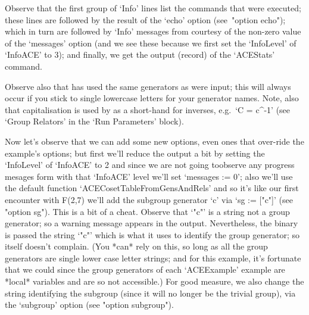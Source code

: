 Observe that the first group of `Info' lines list  the  commands  that
were executed; these lines are followed by the result  of  the  `echo'
option (see~"option echo"); which  in  turn  are  followed  by  `Info'
messages from {\ACE} courtesy of the non-zero value of the  `messages'
option (and we see these because  we  first  set  the  `InfoLevel'  of
`InfoACE' to 3); and finally,  we  get  the  output  (record)  of  the
`ACEStats' command.

Observe also that {\ACE} has used the same generators as  were  input;
this will always occur if you stick to single  lowercase  letters  for
your generator names. Note, also that capitalisation is used by {\ACE}
as a short-hand for inverses, e.g.~`C = c^-1' (see `Group Relators' in
the {\ACE} \lq{}Run Parameters' block).

Now let's observe that we can add some new  options,  even  ones  that
over-ride the example's options; but first we'll reduce the  output  a
bit by setting the `InfoLevel' of `InfoACE' to 2 and since we are  not
going toobserve any progress mesages form {\ACE} with  that  `InfoACE'
level we'll set `messages := 0'; also we'll use the  default  function
`ACECosetTableFromGensAndRels' and so it's like  our  first  encounter
with F(2,7) we'll add the subgroup generator `c'  via  `sg  :=  ["c"]'
(see "option sg"). This is a bit of a cheat. Observe that `"c"'  is  a
string not a {\GAP} group generator; so a warning message  appears  in
the output. Nevertheless, the {\ACE} binary is passed the string `"c"'
which is what it uses to  identify  the  {\GAP}  group  generator;  so
{\ACE} itself doesn't complain. (You *can* rely on this,  so  long  as
all the {\GAP} group generators are single lower case letter  strings;
and for this example, it's fortunate that we  could  since  the  group
generators of each `ACEExample' example are *local* variables and  are
so not accessible.) For  good  measure,  we  also  change  the  string
identifying the subgroup (since it  will  no  longer  be  the  trivial
group), via the `subgroup' option (see "option subgroup").

